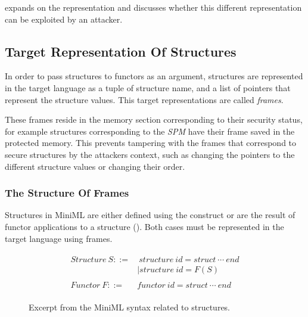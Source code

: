 \documentclass[10pt,a4paper,master=cws, masteroption=ai,english,inputenc=utf8]{kulemt}
\begin{document}
 expands on the representation and discusses whether this different representation can be exploited by an attacker.

\subsection{Target Representation Of Structures\label{sec:LowLevelRepresentation}}
In order to pass structures to functors as an argument, structures are represented in the target language as a tuple of structure name, and a list of pointers that represent the structure values.
This target representations are called \emph{frames}.

These frames reside in the memory section corresponding to their security status, for example
structures corresponding to the \emph{SPM} have their frame saved in the protected memory.
This prevents tampering with the frames that correspond to secure structures by the attackers context, such as changing the pointers to the different structure values or changing their order.

\subsubsection{The Structure Of Frames}
Structures in MiniML are either defined using the  construct or are the result of functor applications to a structure ().
Both cases must be represented in the target language using frames.

\begin{figure}[htb]
\begin{align*}
\begin{aligned}
\mathit{Structure\ }S ::= &\ \mathit{structure\ } \mathit{id} = \mathit{struct\ }\cdots \mathit{\ end}\\
& |\mathit{structure\ } \mathit{id} = F(S)\\
\\
\mathit{Functor\ }F ::=&\mathit{functor\ } \mathit{id} = \mathit{struct\ }\cdots\mathit{\ end}
\end{aligned}
\end{align*}
\caption{Excerpt from the MiniML syntax related to structures\label{fig:FunctorGrammarExcerpt}.}
\end{figure}
\end{document}
